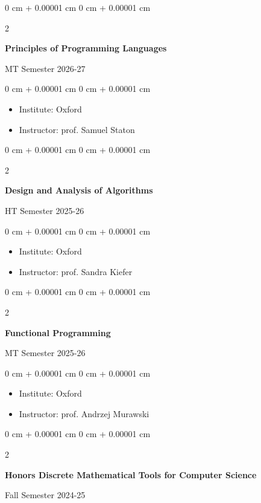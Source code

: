 \documentclass[10pt, letterpaper]{article}
\newenvironment{highlights}{
    \begin{itemize}[
        topsep=0.10 cm,
        parsep=0.10 cm,
        partopsep=0pt,
        itemsep=0pt,
        leftmargin=0 cm + 10pt
    ]
}{
    \end{itemize}
} %
\newenvironment{onecolentry}{
    \begin{adjustwidth}{
        0 cm + 0.00001 cm
    }{
        0 cm + 0.00001 cm
    }
}{
    \end{adjustwidth}
} %
\newenvironment{twocolentry}[2][]{
    \onecolentry
    \def\secondColumn{#2}
    \setcolumnwidth{\fill, 4.5 cm}
    \begin{paracol}{2}
}{
    \switchcolumn \raggedleft \secondColumn
    \end{paracol}
    \endonecolentry
} %
\begin{document}
        \begin{twocolentry}{
                MT Semester 2026-27
            }
                \textbf{Principles of Programming Languages}
            \end{twocolentry}
            \vspace{0.10 cm}
            \begin{onecolentry}
            \begin{highlights}
                \item Institute: Oxford
                \item Instructor: prof. Samuel Staton
            \end{highlights}
        \end{onecolentry}

        \begin{twocolentry}{
                HT Semester 2025-26
            }
                \textbf{Design and Analysis of Algorithms}
            \end{twocolentry}
            \vspace{0.10 cm}
            \begin{onecolentry}
            \begin{highlights}
                \item Institute: Oxford
                \item Instructor: prof. Sandra Kiefer
            \end{highlights}
        \end{onecolentry}
    
    \begin{twocolentry}{
                MT Semester 2025-26
            }
                \textbf{Functional Programming}
            \end{twocolentry}
            \vspace{0.10 cm}
            \begin{onecolentry}
            \begin{highlights}
                \item Institute: Oxford
                \item Instructor: prof. Andrzej Murawski
            \end{highlights}
        \end{onecolentry}
        
     \begin{twocolentry}{
                Fall Semester 2024-25
            }
                \textbf{Honors Discrete Mathematical Tools for Computer Science}
            \end{twocolentry}
\end{document}
